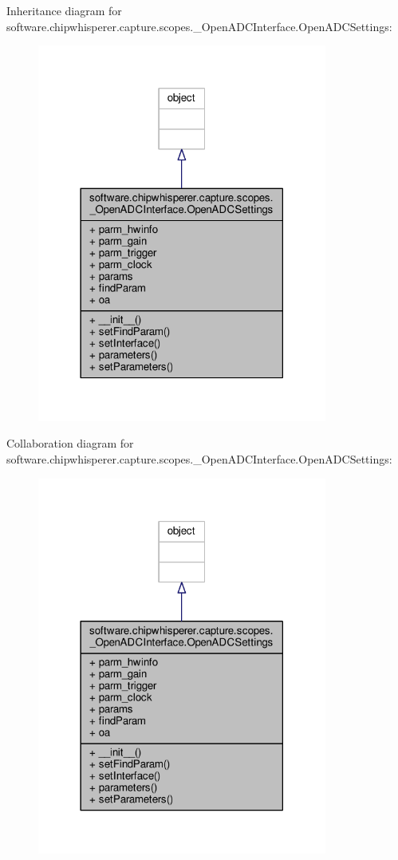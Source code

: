 Inheritance diagram for software.\+chipwhisperer.\+capture.\+scopes.\+\_\+\+Open\+A\+D\+C\+Interface.\+Open\+A\+D\+C\+Settings\+:\nopagebreak
\begin{figure}[H]
\begin{center}
\leavevmode
\includegraphics[width=270pt]{d5/dfc/classsoftware_1_1chipwhisperer_1_1capture_1_1scopes_1_1__OpenADCInterface_1_1OpenADCSettings__inherit__graph}
\end{center}
\end{figure}


Collaboration diagram for software.\+chipwhisperer.\+capture.\+scopes.\+\_\+\+Open\+A\+D\+C\+Interface.\+Open\+A\+D\+C\+Settings\+:\nopagebreak
\begin{figure}[H]
\begin{center}
\leavevmode
\includegraphics[width=270pt]{db/dad/classsoftware_1_1chipwhisperer_1_1capture_1_1scopes_1_1__OpenADCInterface_1_1OpenADCSettings__coll__graph}
\end{center}
\end{figure}


